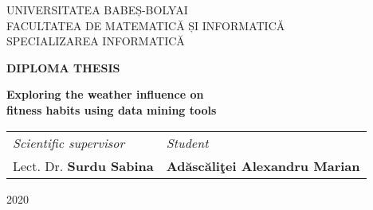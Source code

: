 \documentclass[a4paper, 12pt]{report}
\def\blankpage{%
      \clearpage%
      \thispagestyle{empty}%
      \addtocounter{page}{-1}%
      \null%
      \clearpage}
\begin{document}
\begin{titlepage}

\sloppy

\begin{center}

\normalsize{UNIVERSITATEA BABEȘ-BOLYAI\\}
\vspace{0.25cm}
\normalsize{FACULTATEA DE MATEMATICĂ ȘI INFORMATICĂ\\}
\vspace{0.25cm}
\normalsize{SPECIALIZAREA INFORMATICĂ}

\end{center}

\vspace{4cm}

\begin{center}
\Large \textbf{DIPLOMA THESIS}\\
\vspace{1 cm}

\Huge \textbf{Exploring the weather influence on \\fitness habits using data mining tools}
\end{center}

\vspace{4cm}

\begin{center}

\vspace{1cm}
\begin{tabular}{ll}
\textit{Scientific supervisor}
    \hspace{3cm} & \textit{Student}\\
Lect. Dr. \textbf{Surdu Sabina}      
\hspace{5cm}     & \textbf{Ad\u asc\u ali\c tei Alexandru Marian}\\   
\end{tabular}

\end{center}

\vspace{4cm}

\begin{center}

\normalsize{2020}

\end{center}

\end{titlepage}
\blankpage

\end{document}
